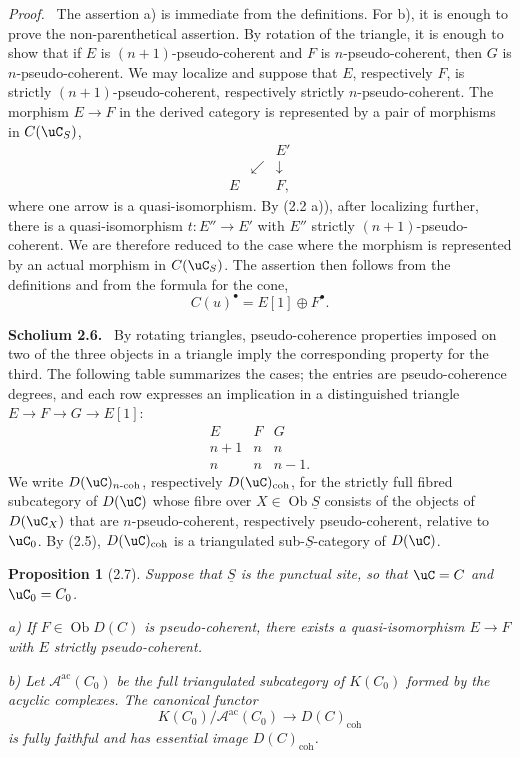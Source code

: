 \documentclass[11pt]{article}
\theoremstyle{plain}
\newtheorem*{proposition*}{Proposition}
\theoremstyle{definition}
\theoremstyle{remark}
\newenvironment{statement}[1]{\par\medskip\noindent\textbf{#1.}\ }{\par\medskip}
\newenvironment{prooftext}{\par\noindent\textit{Proof.}\ }{\par\medskip}
\DeclareMathOperator{\ob}{Ob}
\providecommand{\uS}{\underline{S}}
\begin{document}
\begin{prooftext}
The assertion a) is immediate from the definitions. For b), it is enough to prove the non-parenthetical assertion. By rotation of the triangle, it is enough to show that if $E$ is $(n+1)$-pseudo-coherent and $F$ is $n$-pseudo-coherent, then $G$ is $n$-pseudo-coherent. We may localize and suppose that $E$, respectively $F$, is strictly $(n+1)$-pseudo-coherent, respectively strictly $n$-pseudo-coherent. The morphism $E\to F$ in the derived category is represented by a pair of morphisms in $C(\uC_S)$,
\[
\begin{array}{ccc}
&&E'\\
&\swarrow&\downarrow\\
E&&F,
\end{array}
\]
where one arrow is a quasi-isomorphism. By (2.2 a)), after localizing further, there is a quasi-isomorphism $t:E''\to E'$ with $E''$ strictly $(n+1)$-pseudo-coherent. We are therefore reduced to the case where the morphism is represented by an actual morphism in $C(\uC_S)$. The assertion then follows from the definitions and from the formula for the cone,
\[
C(u)^\bullet=E[1]\oplus F^\bullet .
\]
\end{prooftext}

\begin{statement}{Scholium 2.6}
By rotating triangles, pseudo-coherence properties imposed on two of the three objects in a triangle imply the corresponding property for the third. The following table summarizes the cases; the entries are pseudo-coherence degrees, and each row expresses an implication in a distinguished triangle $E\to F\to G\to E[1]$:
\[
\begin{array}{ccc}
E&F&G\\
n+1&n&n\\
n&n&n-1.
\end{array}
\]
We write $D(\uC)_{n\text{-}\mathrm{coh}}$, respectively $D(\uC)_{\mathrm{coh}}$, for the strictly full fibred subcategory of $D(\uC)$ whose fibre over $X\in\ob\uS$ consists of the objects of $D(\uC_X)$ that are $n$-pseudo-coherent, respectively pseudo-coherent, relative to $\uC_0$. By (2.5), $D(\uC)_{\mathrm{coh}}$ is a triangulated sub-$\uS$-category of $D(\uC)$.
\end{statement}

\begin{proposition*}[2.7]
Suppose that $\uS$ is the punctual site, so that $\uC=C$ and $\uC_0=C_0$.

\textup{a)} If $F\in\ob D(C)$ is pseudo-coherent, there exists a quasi-isomorphism $E\to F$ with $E$ strictly pseudo-coherent.

\textup{b)} Let $\mathcal A^{\mathrm{ac}}(C_0)$ be the full triangulated subcategory of $K(C_0)$ formed by the acyclic complexes. The canonical functor
\[
K(C_0)/\mathcal A^{\mathrm{ac}}(C_0)\longrightarrow D(C)_{\mathrm{coh}}
\]
is fully faithful and has essential image $D(C)_{\mathrm{coh}}$.
\end{proposition*}
\end{document}
